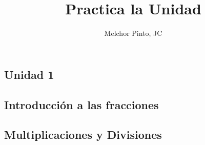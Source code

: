 \documentclass[12pt,addpoints]{repaso}
\title{Practica la Unidad}
\author{Melchor Pinto, JC}
\begin{document}
\INFO
\begin{multicols}{2}
	\tableofcontents
\end{multicols}\newpage
\begin{questions}\large
	\section*{Unidad 1}
	\questionboxed[10]{}


	\subsection*{Introducción a las fracciones}

	\subsection*{Multiplicaciones y Divisiones}


\end{questions}
\end{document}
